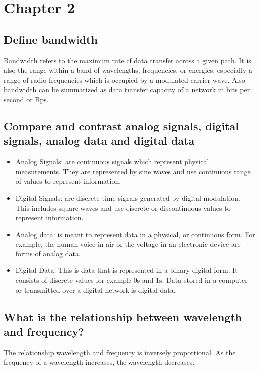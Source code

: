 \documentclass{article}
\begin{document}
\section{Chapter 2}
\subsection{Define bandwidth}
Bandwidth refers to the maximum rate of data transfer across a given path. It is also the range within a band of wavelengths, frequencies, or energies, especially a range of radio frequencies which is occupied by a modulated carrier wave. Also bandwidth can be summarized as data transfer capacity of a network in bits per second or Bps.

\subsection{Compare and contrast analog signals, digital signals, analog data and digital data}
\begin{itemize}
\item Analog Signals: are continuous signals which represent physical measurements. They are represented by sine waves and use continuous range of values to represent information.
\item Digital Signals: are discrete time signals generated by digital modulation. This includes square waves and use discrete or discontinuous values to represent information.
\item Analog data: is meant to represent data in a physical, or continuous form. For example, the human voice in air or the voltage in an electronic device are forms of analog data.
\item Digital Data: This is data that is represented in a binary digital form. It consists of discrete values for example 0s and 1s. Data stored in a computer or transmitted over a digital network is digital data.
\end{itemize}

\subsection{What is the relationship between wavelength and frequency?}
The relationship wavelength and frequency is inversely proportional. As the frequency of a wavelength increases, the wavelength decreases.
\end{document}
